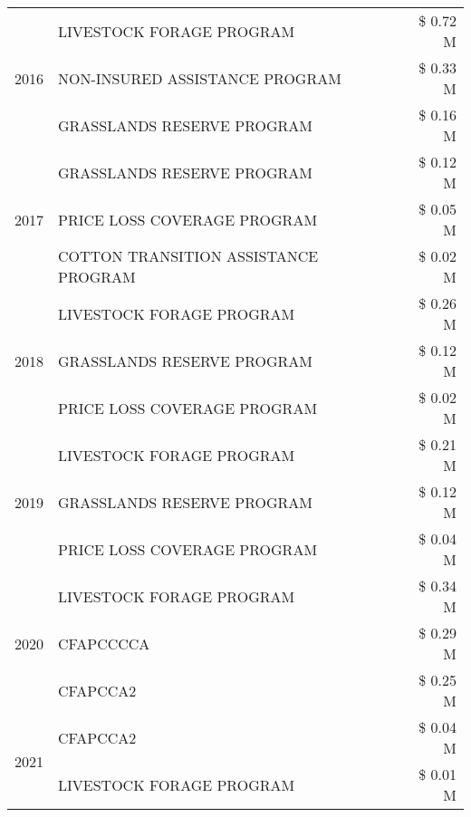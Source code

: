 \begin{tabular}{llr}
\cline{1-3}
\multirow[t]{3}{*}{2016} & LIVESTOCK FORAGE PROGRAM & \$ 0.72 M \\
 & NON-INSURED ASSISTANCE PROGRAM & \$ 0.33 M \\
 & GRASSLANDS RESERVE PROGRAM & \$ 0.16 M \\
\cline{1-3}
\multirow[t]{3}{*}{2017} & GRASSLANDS RESERVE PROGRAM & \$ 0.12 M \\
 & PRICE LOSS COVERAGE PROGRAM & \$ 0.05 M \\
 & COTTON TRANSITION ASSISTANCE PROGRAM & \$ 0.02 M \\
\cline{1-3}
\multirow[t]{3}{*}{2018} & LIVESTOCK FORAGE PROGRAM & \$ 0.26 M \\
 & GRASSLANDS RESERVE PROGRAM & \$ 0.12 M \\
 & PRICE LOSS COVERAGE PROGRAM & \$ 0.02 M \\
\cline{1-3}
\multirow[t]{3}{*}{2019} & LIVESTOCK FORAGE PROGRAM & \$ 0.21 M \\
 & GRASSLANDS RESERVE PROGRAM & \$ 0.12 M \\
 & PRICE LOSS COVERAGE PROGRAM & \$ 0.04 M \\
\cline{1-3}
\multirow[t]{3}{*}{2020} & LIVESTOCK FORAGE PROGRAM & \$ 0.34 M \\
 & CFAPCCCCA & \$ 0.29 M \\
 & CFAPCCA2 & \$ 0.25 M \\
\cline{1-3}
\multirow[t]{2}{*}{2021} & CFAPCCA2 & \$ 0.04 M \\
 & LIVESTOCK FORAGE PROGRAM & \$ 0.01 M \\
\cline{1-3}
\bottomrule
\end{tabular}
